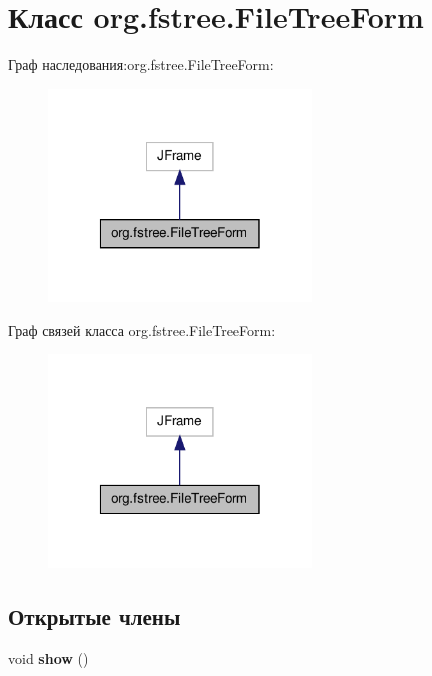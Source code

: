 \hypertarget{classorg_1_1fstree_1_1_file_tree_form}{
\section{Класс org.fstree.FileTreeForm}
\label{classorg_1_1fstree_1_1_file_tree_form}
}


Граф наследования:org.fstree.FileTreeForm:\nopagebreak
\begin{figure}[H]
\begin{center}
\leavevmode
\includegraphics[width=198pt]{classorg_1_1fstree_1_1_file_tree_form__inherit__graph}
\end{center}
\end{figure}


Граф связей класса org.fstree.FileTreeForm:\nopagebreak
\begin{figure}[H]
\begin{center}
\leavevmode
\includegraphics[width=198pt]{classorg_1_1fstree_1_1_file_tree_form__coll__graph}
\end{center}
\end{figure}
\subsection*{Открытые члены}
\begin{DoxyCompactItemize}
\item 
\hypertarget{classorg_1_1fstree_1_1_file_tree_form_ab79812e7077c6cd90678ba00be3d197b}{
void {\bfseries show} ()}
\label{classorg_1_1fstree_1_1_file_tree_form_ab79812e7077c6cd90678ba00be3d197b}

\end{DoxyCompactItemize}

